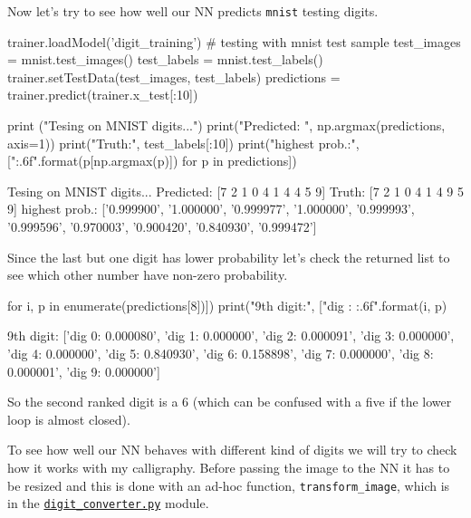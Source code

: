 Now let's try to see how well our NN predicts \texttt{mnist} testing digits.

\begin{ipython}
trainer.loadModel('digit_training')
# testing with mnist test sample
test_images = mnist.test_images()
test_labels = mnist.test_labels()
trainer.setTestData(test_images, test_labels)
predictions = trainer.predict(trainer.x_test[:10])

print ("Tesing on MNIST digits...")
print("Predicted: ", np.argmax(predictions, axis=1))
print("Truth:", test_labels[:10])
print("highest prob.:", ["{:.6f}".format(p[np.argmax(p)]) for p in predictions])
\end{ipython}
\begin{ioutput}
Tesing on MNIST digits...
Predicted:  [7 2 1 0 4 1 4 4 5 9]
Truth: [7 2 1 0 4 1 4 9 5 9]
highest prob.: ['0.999900', '1.000000', '0.999977', '1.000000', '0.999993',
'0.999596', '0.970003', '0.900420', '0.840930', '0.999472']
\end{ioutput}

Since the last but one digit has lower probability let's check the returned list to see which other number have non-zero probability.

\begin{ipython}
for i, p in enumerate(predictions[8])])
    print("9th digit:", ["dig {}: {:.6f}".format(i, p)
\end{ipython}
\begin{ioutput}
9th digit: ['dig 0: 0.000080', 'dig 1: 0.000000', 'dig 2: 0.000091', 'dig 3:
0.000000', 'dig 4: 0.000000', 'dig 5: 0.840930', 'dig 6: 0.158898', 'dig 7:
0.000000', 'dig 8: 0.000001', 'dig 9: 0.000000']
\end{ioutput}

So the second ranked digit is a 6 (which can be confused with a five if the lower loop is almost closed).

To see how well our NN behaves with different kind of digits we will try to check how it works with my calligraphy. Before passing the image to the NN it has to be resized and this is done with an ad-hoc function, \texttt{transform\_image}, which is in the \href{https://raw.githubusercontent.com/matteosan1/finance_course/develop/libro/input_files/digit_converter.py}{\texttt{digit\_converter.py}} module.

